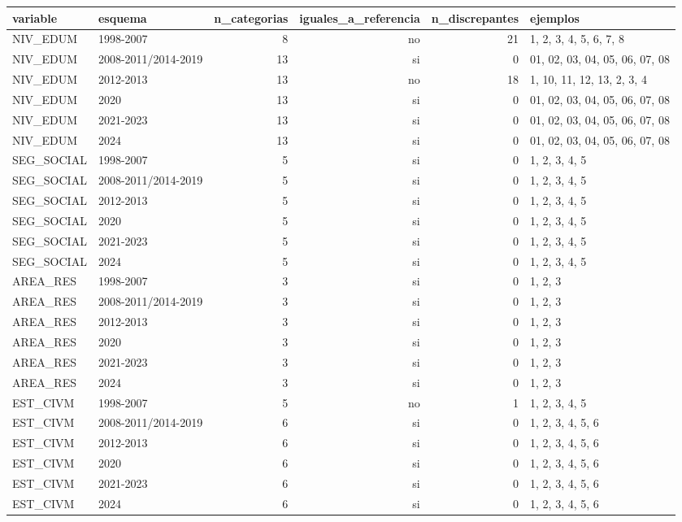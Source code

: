 \begin{tabular}{llrrrl}
\toprule
variable & esquema & n\_categorias & iguales\_a\_referencia & n\_discrepantes & ejemplos \\
\midrule
NIV\_EDUM & 1998-2007 & 8 & no & 21 & 1, 2, 3, 4, 5, 6, 7, 8 \\
NIV\_EDUM & 2008-2011/2014-2019 & 13 & si & 0 & 01, 02, 03, 04, 05, 06, 07, 08 \\
NIV\_EDUM & 2012-2013 & 13 & no & 18 & 1, 10, 11, 12, 13, 2, 3, 4 \\
NIV\_EDUM & 2020 & 13 & si & 0 & 01, 02, 03, 04, 05, 06, 07, 08 \\
NIV\_EDUM & 2021-2023 & 13 & si & 0 & 01, 02, 03, 04, 05, 06, 07, 08 \\
NIV\_EDUM & 2024 & 13 & si & 0 & 01, 02, 03, 04, 05, 06, 07, 08 \\
SEG\_SOCIAL & 1998-2007 & 5 & si & 0 & 1, 2, 3, 4, 5 \\
SEG\_SOCIAL & 2008-2011/2014-2019 & 5 & si & 0 & 1, 2, 3, 4, 5 \\
SEG\_SOCIAL & 2012-2013 & 5 & si & 0 & 1, 2, 3, 4, 5 \\
SEG\_SOCIAL & 2020 & 5 & si & 0 & 1, 2, 3, 4, 5 \\
SEG\_SOCIAL & 2021-2023 & 5 & si & 0 & 1, 2, 3, 4, 5 \\
SEG\_SOCIAL & 2024 & 5 & si & 0 & 1, 2, 3, 4, 5 \\
AREA\_RES & 1998-2007 & 3 & si & 0 & 1, 2, 3 \\
AREA\_RES & 2008-2011/2014-2019 & 3 & si & 0 & 1, 2, 3 \\
AREA\_RES & 2012-2013 & 3 & si & 0 & 1, 2, 3 \\
AREA\_RES & 2020 & 3 & si & 0 & 1, 2, 3 \\
AREA\_RES & 2021-2023 & 3 & si & 0 & 1, 2, 3 \\
AREA\_RES & 2024 & 3 & si & 0 & 1, 2, 3 \\
EST\_CIVM & 1998-2007 & 5 & no & 1 & 1, 2, 3, 4, 5 \\
EST\_CIVM & 2008-2011/2014-2019 & 6 & si & 0 & 1, 2, 3, 4, 5, 6 \\
EST\_CIVM & 2012-2013 & 6 & si & 0 & 1, 2, 3, 4, 5, 6 \\
EST\_CIVM & 2020 & 6 & si & 0 & 1, 2, 3, 4, 5, 6 \\
EST\_CIVM & 2021-2023 & 6 & si & 0 & 1, 2, 3, 4, 5, 6 \\
EST\_CIVM & 2024 & 6 & si & 0 & 1, 2, 3, 4, 5, 6 \\
\bottomrule
\end{tabular}
